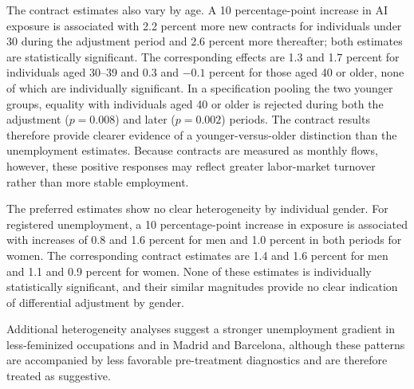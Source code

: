 \documentclass[11pt]{article}
\begin{document}
The contract estimates also vary by age. A 10 percentage-point increase in AI exposure is associated with 2.2 percent more new contracts for individuals under 30 during the adjustment period and 2.6 percent more thereafter; both estimates are statistically significant. The corresponding effects are 1.3 and 1.7 percent for individuals aged 30--39 and 0.3 and \(-0.1\) percent for those aged 40 or older, none of which are individually significant. In a specification pooling the two younger groups, equality with individuals aged 40 or older is rejected during both the adjustment (\(p=0.008\)) and later (\(p=0.002\)) periods. The contract results therefore provide clearer evidence of a younger-versus-older distinction than the unemployment estimates. Because contracts are measured as monthly flows, however, these positive responses may reflect greater labor-market turnover rather than more stable employment.

The preferred estimates show no clear heterogeneity by individual gender. For registered unemployment, a 10 percentage-point increase in exposure is associated with increases of 0.8 and 1.6 percent for men and 1.0 percent in both periods for women. The corresponding contract estimates are 1.4 and 1.6 percent for men and 1.1 and 0.9 percent for women. None of these estimates is individually statistically significant, and their similar magnitudes provide no clear indication of differential adjustment by gender.


Additional heterogeneity analyses suggest a stronger unemployment gradient in less-feminized occupations and in Madrid and Barcelona, although these patterns are accompanied by less favorable pre-treatment diagnostics and are therefore treated as suggestive.
\end{document}
